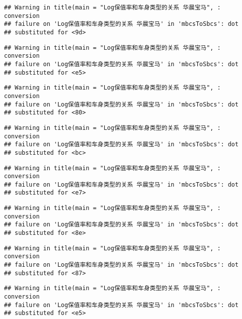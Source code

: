 \documentclass[]{article}
\begin{document}
\begin{verbatim}
## Warning in title(main = "Log保值率和车身类型的关系 华晨宝马", : conversion
## failure on 'Log保值率和车身类型的关系 华晨宝马' in 'mbcsToSbcs': dot
## substituted for <9d>
\end{verbatim}

\begin{verbatim}
## Warning in title(main = "Log保值率和车身类型的关系 华晨宝马", : conversion
## failure on 'Log保值率和车身类型的关系 华晨宝马' in 'mbcsToSbcs': dot
## substituted for <e5>
\end{verbatim}

\begin{verbatim}
## Warning in title(main = "Log保值率和车身类型的关系 华晨宝马", : conversion
## failure on 'Log保值率和车身类型的关系 华晨宝马' in 'mbcsToSbcs': dot
## substituted for <80>
\end{verbatim}

\begin{verbatim}
## Warning in title(main = "Log保值率和车身类型的关系 华晨宝马", : conversion
## failure on 'Log保值率和车身类型的关系 华晨宝马' in 'mbcsToSbcs': dot
## substituted for <bc>
\end{verbatim}

\begin{verbatim}
## Warning in title(main = "Log保值率和车身类型的关系 华晨宝马", : conversion
## failure on 'Log保值率和车身类型的关系 华晨宝马' in 'mbcsToSbcs': dot
## substituted for <e7>
\end{verbatim}

\begin{verbatim}
## Warning in title(main = "Log保值率和车身类型的关系 华晨宝马", : conversion
## failure on 'Log保值率和车身类型的关系 华晨宝马' in 'mbcsToSbcs': dot
## substituted for <8e>
\end{verbatim}

\begin{verbatim}
## Warning in title(main = "Log保值率和车身类型的关系 华晨宝马", : conversion
## failure on 'Log保值率和车身类型的关系 华晨宝马' in 'mbcsToSbcs': dot
## substituted for <87>
\end{verbatim}

\begin{verbatim}
## Warning in title(main = "Log保值率和车身类型的关系 华晨宝马", : conversion
## failure on 'Log保值率和车身类型的关系 华晨宝马' in 'mbcsToSbcs': dot
## substituted for <e5>
\end{verbatim}
\end{document}
